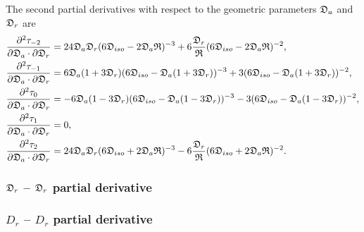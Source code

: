 The second partial derivatives with respect to the geometric parameters $\mathfrak{D}_a$ and $\mathfrak{D}_r$ are
\begin{subequations}
\begin{align}
    \frac{\partial^2 \tau_{-2}}{\partial \mathfrak{D}_a \cdot \partial \mathfrak{D}_r} &= 24 \mathfrak{D}_a \mathfrak{D}_r (6\mathfrak{D}_{iso} - 2\mathfrak{D}_a\mathfrak{R})^{-3}
        + 6 \frac{\mathfrak{D}_r}{\mathfrak{R}} (6\mathfrak{D}_{iso} - 2\mathfrak{D}_a\mathfrak{R})^{-2}, \\
    \frac{\partial^2 \tau_{-1}}{\partial \mathfrak{D}_a \cdot \partial \mathfrak{D}_r} &= 6\mathfrak{D}_a(1 + 3\mathfrak{D}_r) (6\mathfrak{D}_{iso} - \mathfrak{D}_a (1 + 3\mathfrak{D}_r))^{-3}
        + 3 (6\mathfrak{D}_{iso} - \mathfrak{D}_a (1 + 3\mathfrak{D}_r))^{-2}, \\
    \frac{\partial^2 \tau_{0}}{\partial \mathfrak{D}_a \cdot \partial \mathfrak{D}_r}  &= -6\mathfrak{D}_a(1 - 3\mathfrak{D}_r) (6\mathfrak{D}_{iso} - \mathfrak{D}_a (1 - 3\mathfrak{D}_r))^{-3}
        - 3 (6\mathfrak{D}_{iso} - \mathfrak{D}_a (1 - 3\mathfrak{D}_r))^{-2}, \\
    \frac{\partial^2 \tau_{1}}{\partial \mathfrak{D}_a \cdot \partial \mathfrak{D}_r}  &= 0, \\
    \frac{\partial^2 \tau_{2}}{\partial \mathfrak{D}_a \cdot \partial \mathfrak{D}_r}  &= 24 \mathfrak{D}_a \mathfrak{D}_r (6\mathfrak{D}_{iso} + 2\mathfrak{D}_a\mathfrak{R})^{-3}
        - 6 \frac{\mathfrak{D}_r}{\mathfrak{R}} (6\mathfrak{D}_{iso} + 2\mathfrak{D}_a\mathfrak{R})^{-2}.
\end{align}
\end{subequations}



\begin{latexonly}
    \subsubsection{$\mathfrak{D}_r$ -- $\mathfrak{D}_r$ partial derivative}
\end{latexonly}
\begin{htmlonly}
    \subsubsection{$D_r$ -- $D_r$ partial derivative}
\end{htmlonly}

